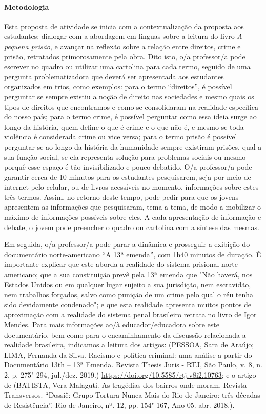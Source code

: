 \documentclass[11pt]{extarticle}
\begin{document}
\paragraph{Metodologia} Esta proposta de atividade se inicia com a
contextualização da proposta aos estudantes: dialogar com a abordagem em
línguas sobre a leitura do livro \emph{A pequena prisão}, e avançar na
reflexão sobre a relação entre direitos, crime e prisão, retratados
primorosamente pela obra. Dito isto, o/a professor/a pode escrever no
quadro ou utilizar uma cartolina para cada termo, seguido de uma
pergunta problematizadora que deverá ser apresentada aos estudantes
organizados em trios, como exemplos: para o termo ``direitos'', é
possível perguntar se sempre existiu a noção de direito nas sociedades e
mesmo quais os tipos de direitos que encontramos e como se consolidaram
na realidade específica do nosso país; para o termo crime, é possível
perguntar como essa ideia surge ao longo da história, quem define o que
é crime e o que não é, e mesmo se toda violência é considerada crime ou
vice versa; para o termo prisão é possível perguntar se ao longo da
história da humanidade sempre existiram prisões, qual a sua função
social, se ela representa solução para problemas sociais ou mesmo porquê
esse espaço é tão invisibilizado e pouco debatido. O/a professor/a pode
garantir cerca de 10 minutos para os estudantes pesquisarem, seja por
meio de internet pelo celular, ou de livros acessíveis no momento,
informações sobre estes três termos. Assim, no retorno deste tempo, pode
pedir para que os jovens apresentem as informações que pesquisaram, tema
a tema, de modo a mobilizar o máximo de informações possíveis sobre
eles. A cada apresentação de informação e debate, o jovem pode preencher
o quadro ou cartolina com a síntese das mesmas.

Em seguida, o/a professor/a pode parar a dinâmica e prosseguir a
exibição do documentário norte-americano ``A 13ª emenda'', com 1h40
minutos de duração. É importante explicar que este aborda a realidade do
sistema prisional norte americano; que a sua constituição prevê pela 13ª
emenda que "Não haverá, nos Estados Unidos ou em qualquer lugar sujeito
a sua jurisdição, nem escravidão, nem trabalhos forçados, salvo como
punição de um crime pelo qual o réu tenha sido devidamente condenado"; e
que esta realidade apresenta muitos pontos de aproximação com a
realidade do sistema penal brasileiro retrata no livro de Igor Mendes.
Para mais informações ao/à educador/educadora sobre este documentário, bem
como para o encaminhamento da discussão relacionada a realidade
brasileira, indicamos a leitura dos artigos: (PESSOA, Sara de Araújo;
LIMA, Fernanda da Silva. Racismo e política criminal: uma análise a
partir do Documentário 13th -- 13ª Emenda. Revista Thesis Juris - RTJ,
São Paulo, v. 8, n. 2, p. 275"-294, jul./dez. 2019.)
\href{https://doi.org/10.5585/rtj.v8i2.10763}{{https://doi.org/10.5585/rtj.v8i2.10763}};
e o artigo de (BATISTA, Vera Malaguti. As tragédias dos bairros onde
moram. Revista Transversos. ``Dossiê: Grupo Tortura Nunca Mais do Rio de
Janeiro: três décadas de Resistência''. Rio de Janeiro, nº. 12, pp.
154"-167, Ano 05. abr. 2018.).
\end{document}
